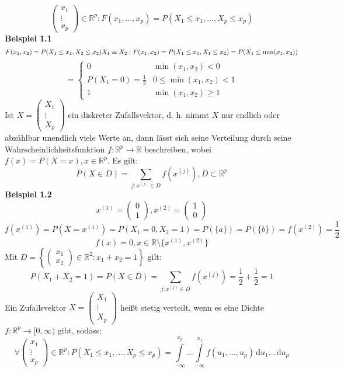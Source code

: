 \documentclass[12pt, a4paper]{article}
\theoremstyle{plain}
\theoremstyle{definition}
\newcommand{\1}{\mathds{1}}
\renewcommand{\d}{\,\mathrm{d}}
\begin{document}
\[\begin{pmatrix}x_1\\\vdots\\x_p\end{pmatrix}\in\mathbb{R}^p:F(x_1,\dots,x_p)=P(X_1\le x_1,\dots,X_p\le x_p)\]
\textbf{Beispiel 1.1}   \[F(x_1,x_2)=P(X_1\le x_1, X_2\le x_2)\\X_1\equiv X_2:F(x_1,x_2)=P(X_1\le x_1, X_1\le x_2)=P(X_1\le \min(x_1,x_2))\]
\[=\begin{cases}0&\min(x_1,x_2)<0\\P(X_1=0)=\frac{1}{2}&0\le \min(x_1,x_2)<1\\1&\min(x_1,x_2)\ge 1\end{cases}\]
   Ist \(X=\begin{pmatrix}X_1\\\vdots\\X_p\end{pmatrix}\) ein diskreter Zufallsvektor, d. h. nimmt \(X\) nur endlich oder abzählbar unendlich viele Werte an, dann lässt sich seine Verteilung durch seine Wahrscheinlichkeitsfunktion \(f:\mathbb{R}^p\rightarrow\mathbb{R}\) beschreiben, wobei \(f(x)=P(X=x),x\in\mathbb{R}^p\). Es gilt:
   \[P(X\in D)=\sum_{j:x^{(j)}\in D}f(x^{(j)}),D\subset\mathbb{R}^p\]
   \textbf{Beispiel 1.2}
   \[x^{(1)}=\begin{pmatrix}0\\1\end{pmatrix},x^{(2)}=\begin{pmatrix}1\\0\end{pmatrix}\]
   \[f(x^{(1)})=P(X=x^{(1)})=P(X_1=0,X_2=1)=P(\{a\})=P(\{b\})=f(x^{(2)})=\frac{1}{2}\]
   \[f(x)=0,x\in\mathbb{R}\setminus\{x^{(1)},x^{(2)}\}\]
   Mit $D=\left\{\begin{pmatrix}x_1\\x_2\end{pmatrix}\in\mathbb{R}^2:x_1+x_2=1\right\}$ gilt:
   \[P(X_1+X_2=1)=P(X\in D)=\sum_{j:x^{(j)}\in D}f(x^{(j)})=\frac{1}{2}+\frac{1}{2}=1\]
   Ein Zufallsvektor \(X=\begin{pmatrix}X_1\\\vdots\\X_p\end{pmatrix}\) heißt stetig verteilt, wenn es eine Dichte \(f:\mathbb{R}^p\rightarrow[0,\infty)\) gibt, sodass:
   \[\forall\begin{pmatrix}x_1\\\vdots\\x_p\end{pmatrix}\in\mathbb{R}^p:P(X_1\le x_1,\dots,X_p\le x_p)=\int\limits_{-\infty}^{x_p}\dots\int\limits_{-\infty}^{x_1}f(u_1,\dots,u_p)\d u_1\dots \d u_p\]
\end{document}
